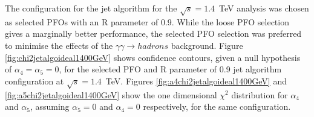 The configuration for the jet algorithm for the $\sqrt{s}=1.4$~TeV analysis was chosen as selected PFOs with an R parameter of 0.9.  While the loose PFO selection gives a marginally better performance, the selected PFO selection was preferred to minimise the effects of the $\gamma\gamma \rightarrow hadrons$ background.  Figure \ref{fig:chi2jetalgoideal1400GeV} shows confidence contours, given a null hypothesis of $\alpha_{4} = \alpha_{5} = 0$, for the selected PFO and R parameter of 0.9 jet algorithm configuration at $\sqrt{s}=1.4$~TeV.  Figures \ref{fig:a4chi2jetalgoideal1400GeV} and \ref{fig:a5chi2jetalgoideal1400GeV} show the one dimensional $\chi^{2}$ distribution for $\alpha_{4}$ and $\alpha_{5}$, assuming $\alpha_{5} = 0$ and $\alpha_{4} = 0$ respectively, for the same configuration.  

\begin{figure}[h!]
\centering
{}\hfill
{}

\end{figure}
